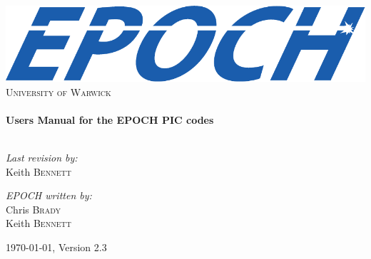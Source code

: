 \begin{titlepage}

\begin{center}

\includegraphics[width=14cm]{./images/EPOCHLogo}\\[1cm]

\textsc{\LARGE{University of Warwick}}\\[1.5cm]

\HRule\\[0.2cm]
{\huge\bfseries{Users Manual for the EPOCH PIC codes}}\\[0.4cm]
\HRule\\[1.5cm]

\begin{minipage}{0.4\textwidth}
\begin{flushleft}\large%
\emph{Last revision by:}\\
Keith \textsc{Bennett}
\end{flushleft}
\end{minipage}
\begin{minipage}{0.4\textwidth}
\begin{flushright}\large%
\emph{EPOCH written by:} \\
Chris \textsc{Brady}\\
Keith \textsc{Bennett}\\
\end{flushright}
\end{minipage}

\vfill%
{\large\today, {\EPOCH} Version 2.3}

\end{center}

\end{titlepage}
